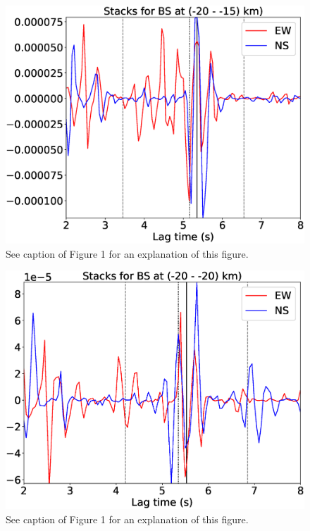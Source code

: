 \documentclass[letterpaper, 12pt]{article}
\begin{document}
\begin{figure}[H]
\includegraphics[width=\linewidth]{figures/intervals/BS_-20_-15_stacks.eps}
\caption{See caption of Figure 1 for an explanation of this figure.}
\end{figure}

\begin{figure}[H]
\includegraphics[width=\linewidth]{figures/intervals/BS_-20_-20_stacks.eps}
\caption{See caption of Figure 1 for an explanation of this figure.}
\end{figure}
\end{document}

